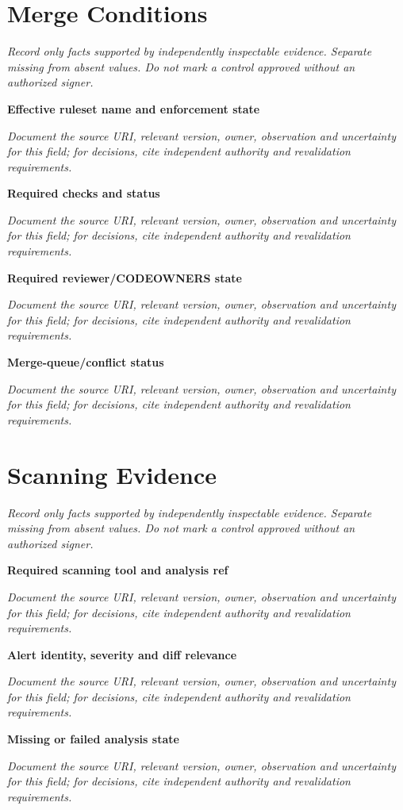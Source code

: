 \documentclass[11pt,letterpaper]{article}
\begin{document}
\section{Merge Conditions}
\noindent\emph{Record only facts supported by independently inspectable evidence. Separate missing from absent values. Do not mark a control approved without an authorized signer.}\par
\noindent\textbf{Effective ruleset name and enforcement state}\par
\noindent\emph{Document the source URI, relevant version, owner, observation and uncertainty for this field; for decisions, cite independent authority and revalidation requirements.}\par\medskip
\noindent\textbf{Required checks and status}\par
\noindent\emph{Document the source URI, relevant version, owner, observation and uncertainty for this field; for decisions, cite independent authority and revalidation requirements.}\par\medskip
\noindent\textbf{Required reviewer/CODEOWNERS state}\par
\noindent\emph{Document the source URI, relevant version, owner, observation and uncertainty for this field; for decisions, cite independent authority and revalidation requirements.}\par\medskip
\noindent\textbf{Merge-queue/conflict status}\par
\noindent\emph{Document the source URI, relevant version, owner, observation and uncertainty for this field; for decisions, cite independent authority and revalidation requirements.}\par\medskip
\section{Scanning Evidence}
\noindent\emph{Record only facts supported by independently inspectable evidence. Separate missing from absent values. Do not mark a control approved without an authorized signer.}\par
\noindent\textbf{Required scanning tool and analysis ref}\par
\noindent\emph{Document the source URI, relevant version, owner, observation and uncertainty for this field; for decisions, cite independent authority and revalidation requirements.}\par\medskip
\noindent\textbf{Alert identity, severity and diff relevance}\par
\noindent\emph{Document the source URI, relevant version, owner, observation and uncertainty for this field; for decisions, cite independent authority and revalidation requirements.}\par\medskip
\noindent\textbf{Missing or failed analysis state}\par
\noindent\emph{Document the source URI, relevant version, owner, observation and uncertainty for this field; for decisions, cite independent authority and revalidation requirements.}\par\medskip
\end{document}

